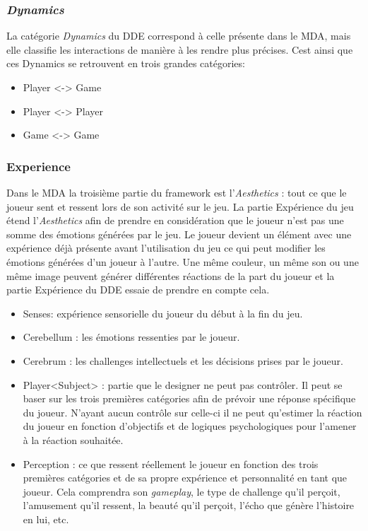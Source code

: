\subsubsection{\emph{Dynamics} }
    La catégorie \emph{Dynamics} du DDE correspond à celle présente dans le MDA, mais elle classifie les interactions de manière à les rendre plus précises. Cest ainsi que ces Dynamics se retrouvent en trois grandes catégories: 
    \begin{itemize}
        \item Player <-> Game
        \item Player <-> Player
        \item Game <-> Game
    \end{itemize}

\subsubsection{Experience}
    Dans le MDA la troisième partie du framework est l'\emph{Aesthetics} : tout ce que le joueur sent et ressent lors de son activité sur le jeu. La partie Expérience du jeu étend l'\emph{Aesthetics} afin de prendre en considération que le joueur n'est pas une somme des émotions générées par le jeu. Le joueur devient un élément avec une expérience déjà présente avant l'utilisation du jeu ce qui peut modifier les émotions générées d'un joueur à l'autre. Une même couleur, un même son ou une même image peuvent générer différentes réactions de la part du joueur et la partie Expérience du DDE essaie de prendre en compte cela.
    \begin{itemize}
        \item Senses: expérience sensorielle du joueur du début à la fin du jeu.
        \item Cerebellum : les émotions ressenties par le joueur.
        \item Cerebrum : les challenges intellectuels et les décisions prises par le joueur.
        \item Player<Subject> : partie que le designer ne peut pas contrôler. Il peut se baser sur les trois premières catégories afin de prévoir une réponse spécifique du joueur. N'ayant aucun contrôle sur celle-ci il ne peut qu'estimer la réaction du joueur en fonction d'objectifs et de logiques psychologiques pour l'amener à la réaction souhaitée.
        \item Perception : ce que ressent réellement le joueur en fonction des trois premières catégories et de sa propre expérience et personnalité en tant que joueur. Cela comprendra son \emph{gameplay}, le type de challenge qu'il perçoit, l'amusement qu'il ressent, la beauté qu'il perçoit, l'écho que génère l'histoire en lui, etc.
    \end{itemize}


